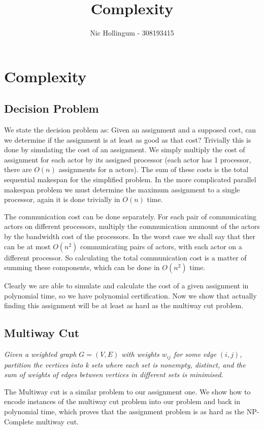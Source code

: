 \documentclass{article}
\author{Nic Hollingum - 308193415}
\title{Complexity}
\begin{document}
\section*{Complexity}

\subsection*{Decision Problem}
We state the decision problem as: Given an assignment and a supposed cost, can we determine if the assignment is at least as good as that cost?
Trivially this is done by simulating the cost of an assignment.
We simply multiply the cost of assignment for each actor by its assigned processor (each actor has 1 processor, there are $O(n)$ assignments for n actors).
The sum of these costs is the total sequential makespan for the simplified problem.
In the more complicated parallel makespan problem we must determine the maximum assignment to a single processor, again it is done trivially in $O(n)$ time.

The communication cost can be done separately.
For each pair of communicating actors on different processors, multiply the communication ammount of the actors by the bandwidth cost of the processors.
In the worst case we shall say that ther can be at most $O(n^2)$ communicating pairs of actors, with each actor on a different processor.
So calculating the total communication cost is a matter of summing these components, which can be done in $O(n^2)$ time.

Clearly we are able to simulate and calculate the cost of a given assignment in polynomial time, so we have polynomial certification.
Now we show that actually finding this assignment will be at least as hard as the multiway cut problem.

\subsection*{Multiway Cut}

{\em Given a weighted graph $G = (V,E)$ with weights $w_{ij}$ for some edge $(i,j)$, partition the vertices into k sets where each set is nonempty, distinct, and the sum of weights of edges between vertices in different sets is minimised.}

The Multiway cut is a similar problem to our assignment one.
We show how to encode instances of the multiway cut problem into our problem and back in polynomial time, which proves that the assignment problem is as hard as the NP-Complete multiway cut.
\end{document}
